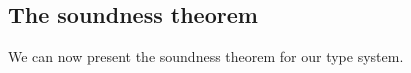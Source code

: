 \documentclass{llncs}
\newcommand{\sqleq}{\ensuremath{\sqsubseteq\xspace}}
\begin{document}







\subsection{The soundness theorem}

We can now present the soundness theorem for our type system.
\end{document}

